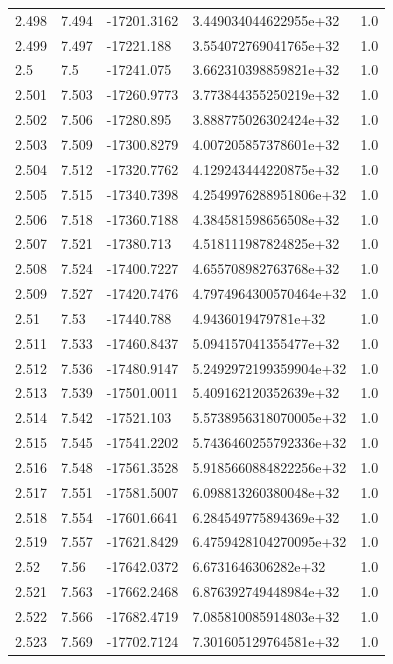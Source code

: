 \begin{tabular}{lllll}
2.498 & 7.494 & -17201.3162 & 3.449034044622955e+32 & 1.0 \\
2.499 & 7.497 & -17221.188 & 3.554072769041765e+32 & 1.0 \\
2.5 & 7.5 & -17241.075 & 3.662310398859821e+32 & 1.0 \\
2.501 & 7.503 & -17260.9773 & 3.773844355250219e+32 & 1.0 \\
2.502 & 7.506 & -17280.895 & 3.888775026302424e+32 & 1.0 \\
2.503 & 7.509 & -17300.8279 & 4.007205857378601e+32 & 1.0 \\
2.504 & 7.512 & -17320.7762 & 4.129243444220875e+32 & 1.0 \\
2.505 & 7.515 & -17340.7398 & 4.2549976288951806e+32 & 1.0 \\
2.506 & 7.518 & -17360.7188 & 4.384581598656508e+32 & 1.0 \\
2.507 & 7.521 & -17380.713 & 4.518111987824825e+32 & 1.0 \\
2.508 & 7.524 & -17400.7227 & 4.655708982763768e+32 & 1.0 \\
2.509 & 7.527 & -17420.7476 & 4.7974964300570464e+32 & 1.0 \\
2.51 & 7.53 & -17440.788 & 4.9436019479781e+32 & 1.0 \\
2.511 & 7.533 & -17460.8437 & 5.094157041355477e+32 & 1.0 \\
2.512 & 7.536 & -17480.9147 & 5.2492972199359904e+32 & 1.0 \\
2.513 & 7.539 & -17501.0011 & 5.409162120352639e+32 & 1.0 \\
2.514 & 7.542 & -17521.103 & 5.5738956318070005e+32 & 1.0 \\
2.515 & 7.545 & -17541.2202 & 5.7436460255792336e+32 & 1.0 \\
2.516 & 7.548 & -17561.3528 & 5.9185660884822256e+32 & 1.0 \\
2.517 & 7.551 & -17581.5007 & 6.098813260380048e+32 & 1.0 \\
2.518 & 7.554 & -17601.6641 & 6.284549775894369e+32 & 1.0 \\
2.519 & 7.557 & -17621.8429 & 6.4759428104270095e+32 & 1.0 \\
2.52 & 7.56 & -17642.0372 & 6.6731646306282e+32 & 1.0 \\
2.521 & 7.563 & -17662.2468 & 6.876392749448984e+32 & 1.0 \\
2.522 & 7.566 & -17682.4719 & 7.085810085914803e+32 & 1.0 \\
2.523 & 7.569 & -17702.7124 & 7.301605129764581e+32 & 1.0 \\

\end{tabular}
